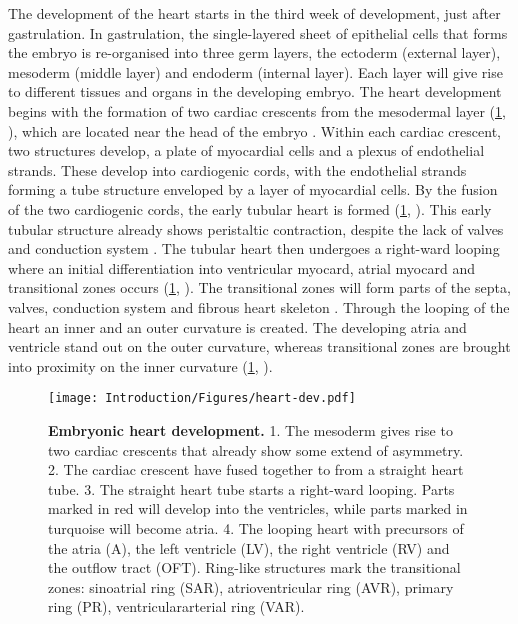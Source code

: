 The development of the heart starts in the third week of development, just after gastrulation. In gastrulation, the single-layered sheet of epithelial cells that forms the embryo is re-organised into three germ layers, the ectoderm (external layer), mesoderm  (middle layer) and endoderm (internal layer). Each layer will give rise to different tissues and organs in the developing embryo. The heart development begins with the formation of two cardiac crescents from the mesodermal layer (\cref{fig:dev-heart}, ), which are located near the head of the embryo \citep{Christoffels2000}. Within each cardiac crescent, two structures develop, a plate of myocardial cells and a plexus of endothelial strands. These develop into cardiogenic cords, with the endothelial strands forming a tube structure enveloped  by a layer of myocardial cells. By the fusion of the two cardiogenic cords, the early tubular heart is formed (\cref{fig:dev-heart}, ). This early tubular structure already shows peristaltic contraction, despite the lack of valves and conduction system \citep{Goss1938,deJong1992,Moorman1994}. The tubular heart then undergoes a right-ward looping where an initial differentiation into ventricular myocard, atrial myocard and transitional zones occurs (\cref{fig:dev-heart}, ). The transitional zones will form parts of the septa, valves, conduction system and fibrous heart skeleton \citep{Gittenberger-deGroot2005}. Through the looping of the heart an inner and an outer curvature is created. The developing atria and ventricle stand out on the outer curvature, whereas transitional zones are brought into proximity on the inner curvature (\cref{fig:dev-heart}, ). 

\begin{figure}[hbtp]
	\centering
	\texttt{[image: Introduction/Figures/heart-dev.pdf]}
	\caption[\textbf{Embryonic heart development. }]{\textbf{Embryonic heart development. } 1. The mesoderm gives rise to two cardiac crescents that already show some extend of asymmetry. 2. The cardiac crescent have fused together to from a straight heart tube. 3. The straight heart tube starts a right-ward looping. Parts marked in red will develop into the ventricles, while parts marked in turquoise will become atria. 4. The looping heart with precursors of the atria (A), the left ventricle (LV), the right ventricle (RV) and the outflow tract (OFT). Ring-like structures mark the transitional zones: sinoatrial ring (SAR), atrioventricular ring (AVR), primary ring (PR), ventriculararterial ring (VAR).} 
	 	\label{fig:dev-heart}
\end{figure}

